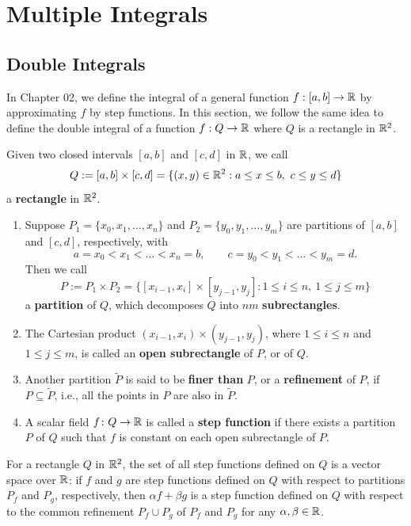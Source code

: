 \chapter{Multiple Integrals}
\section{Double Integrals}
In Chapter 02, we define the integral of a general function \(f: [a,b] \to \mathbb{R}\) by approximating \(f\) by step functions. In this section, we follow the same idea to define the double integral of a function \(f: Q \to \mathbb{R}\) where \(Q\) is a rectangle in \(\mathbb{R}^2\).
\begin{definitionenv}
    Given two closed intervals \([a,b]\) and \([c,d]\) in \(\mathbb{R}\), we call
    \[
        Q := [a,b]\times[c,d]
        = \{(x,y) \in \mathbb{R}^2 : a \leq x \leq b,\ c \leq y \leq d\}
    \]
    a \textbf{rectangle} in \(\mathbb{R}^2\).

    \begin{enumerate}
        \item Suppose \(P_1 = \{x_0, x_1, \dots, x_n\}\) and \(P_2 = \{y_0, y_1, \dots, y_m\}\) are partitions of \([a,b]\) and \([c,d]\), respectively, with
        \[
            a = x_0 < x_1 < \dots < x_n = b,
            \qquad
            c = y_0 < y_1 < \dots < y_m = d.
        \]
        Then we call
        \[
            P := P_1 \times P_2
            =
            \{[x_{i-1},x_i]\times[y_{j-1},y_j] : 1 \leq i \leq n,\ 1 \leq j \leq m\}
        \]
        a \textbf{partition} of \(Q\), which decomposes \(Q\) into \(nm\) \textbf{subrectangles}.

        \item The Cartesian product \((x_{i-1},x_i)\times(y_{j-1},y_j)\), where \(1 \leq i \leq n\) and \(1 \leq j \leq m\), is called an \textbf{open subrectangle} of \(P\), or of \(Q\).

        \item Another partition \(\widetilde P\) is said to be \textbf{finer than} \(P\), or a \textbf{refinement} of \(P\), if \(P \subseteq \widetilde P\), i.e., all the points in \(P\) are also in \(\widetilde P\).

        \item A scalar field \(f\colon Q \to \mathbb{R}\) is called a \textbf{step function} if there exists a partition \(P\) of \(Q\) such that \(f\) is constant on each open subrectangle of \(P\).
    \end{enumerate}
\end{definitionenv}
\begin{remarkenv}
    For a rectangle $Q$ in $\mathbb{R}^2$, the set of all step functions defined on $Q$ is a vector space over $\mathbb{R}$: if $f$ and $g$ are step functions defined on $Q$ with respect to partitions $P_f$ and $P_g$, respectively, then $\alpha f + \beta g$ is a step function defined on $Q$ with respect to the common refinement $P_f \cup P_g$ of $P_f$ and $P_g$ for any $\alpha, \beta \in \mathbb{R}$.
\end{remarkenv}
